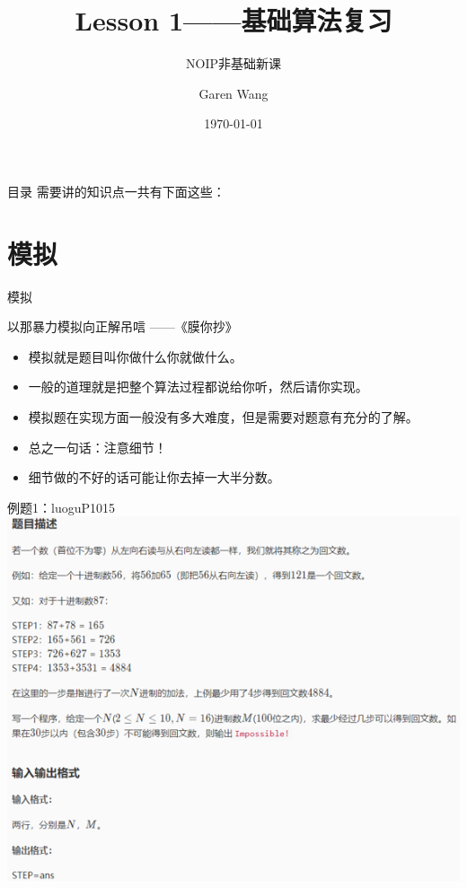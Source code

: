 \documentclass{beamer}[UTF-8]
\title{Lesson 1——基础算法复习}
\subtitle{NOIP非基础新课}
\author{Garen Wang}
\date{\today}
\begin{document}
\maketitle

\begin{frame}{目录}
需要讲的知识点一共有下面这些： \pause
\tableofcontents
\end{frame}

\section{模拟} %
\begin{frame}{模拟}
\begin{center} 以那暴力模拟向正解吊唁 ——《膜你抄》 \end{center}

\begin{itemize}
\item 模拟就是题目叫你做什么你就做什么。  \pause
\item 一般的道理就是把整个算法过程都说给你听，然后请你实现。   \pause
\item 模拟题在实现方面一般没有多大难度，但是需要对题意有充分的了解。  \pause
\item 总之一句话：注意细节！  \pause
\item 细节做的不好的话可能让你去掉一大半分数。
\end{itemize}

\end{frame}

\begin{frame}{例题1：luoguP1015}
\includegraphics{luoguP1015.png}
\end{frame}
\end{document}
